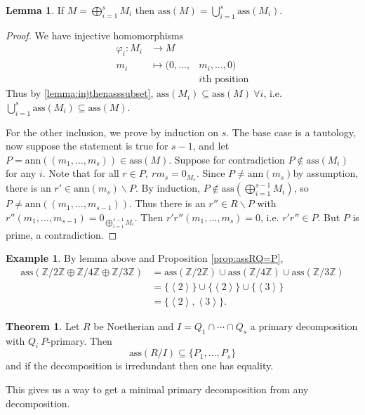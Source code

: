 \documentclass[a4paper]{article}
\newcommand{\la}{\left\langle}
\newcommand{\ra}{\right\rangle}
\newcommand{\Z}{\mathbb Z}
\newcommand{\ass}{\text{ass}}
\newcommand{\ann}{\text{ann}}
\theoremstyle{definition}
\newtheorem{thm}[defn]{Theorem}
\newtheorem{lemma}[defn]{Lemma}
\newtheorem{example}[defn]{Example}
\begin{document}
\begin{lemma}
If $M=\bigoplus_{i=1}^s M_i$ then $\ass(M)=\bigcup_{i=1}^s \ass (M_i)$.
\end{lemma}
\begin{proof}
We have injective homomorphisms
\[
\begin{aligned}
\varphi_i:M_i&\rightarrow M\\
m_i&\mapsto(0,\ldots,&m_i,\ldots,0)\\
&&i\text{th position}
\end{aligned}
\]
Thus by \ref{lemma:injthenasssubset}, $\ass(M_i)\subseteq\ass(M) \ \forall i$, i.e. $\bigcup_{i=1}^s \ass (M_i)\subseteq \ass(M)$.

For the other inclusion, we prove by induction on $s$. The base case is a tautology, now suppose the statement is true for $s-1$, and let $P=\ann((m_1,\ldots,m_s))\in\ass(M)$. Suppose for contradiction $P\notin\ass(M_i)$ for any $i$. Note that for all $r\in P,\ rm_s=0_{M_s}$. Since $P\neq\ann(m_s)$by assumption, there is an $r'\in\ann(m_s)\backslash P$. By induction, $P\notin\ass\left(\bigoplus_{i=1}^{s-1} M_i\right)$, so $P\neq \ann((m_1,\ldots,m_{s-1}))$. Thus there is an $r''\in R\backslash P$ with $r''(m_1,\ldots,m_{s-1})=0_{\bigoplus_{i=1}^{s-1} M_i}$. Then $r'r''(m_1,\ldots,m_s)=0$, i.e. $r'r''\in P$. But $P$ is prime, a contradiction.
\end{proof}

\begin{example}
By lemma above and Proposition \ref{prop:assRQ=P},
\[
\begin{aligned}
\ass(\Z/2\Z\oplus\Z/4\Z\oplus\Z/3\Z)&=\ass(\Z/2\Z)\cup\ass(\Z/4\Z)\cup\ass(\Z/3\Z)\\
&=\{\la 2\ra\}\cup\{\la 2\ra\}\cup\{\la 3\ra\}\\
&=\{\la 2\ra,\la 3\ra\}.
\end{aligned}
\]
\end{example}

\begin{thm}
Let $R$ be Noetherian and $I=Q_1\cap\cdots\cap Q_s$ a primary decomposition with $Q_i \ P$-primary. Then
\[
\ass(R/I)\subseteq \{P_1,\ldots,P_s\}
\]
and if the decomposition is irredundant then one has equality.
\end{thm}

This gives us a way to get a minimal primary decomposition from any decomposition.
\end{document}
